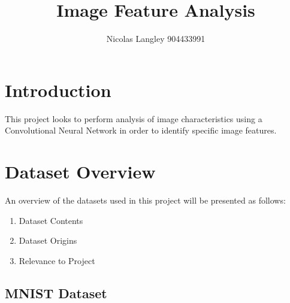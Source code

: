 \documentclass{article}
\begin{document}
\title{Image Feature Analysis}
\author{Nicolas Langley 904433991}
\maketitle
\section{Introduction}

This project looks to perform analysis of image characteristics using a Convolutional
Neural Network in order to identify specific image features.  

\section{Dataset Overview}

An overview of the datasets used in this project will be presented as follows:
\begin{enumerate}
  \item Dataset Contents
  \item Dataset Origins
  \item Relevance to Project
\end{enumerate}

\subsection{MNIST Dataset}
\end{document}
